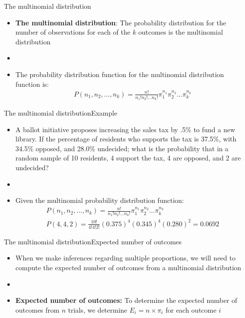 \documentclass[xcolor=dvipsnames]{beamer}
\begin{document}
\begin{frame}{The multinomial distribution}
	\begin{itemize}
		\item \textbf{The multinomial distribution}: The probability distribution for the number of observations for each of the $k$ outcomes is the multinomial distribution
		\item[]
		\item The probability distribution function for the multinomial distribution function is:
		\begin{gather*}
			P(n_1, n_2, \hdots, n_k) = \frac{n!}{n_1!n_2!\hdots n_k!}\pi_1^{n_1}\pi_2^{n_2}\hdots \pi_k^{n_k}
		\end{gather*}
	\end{itemize}
\end{frame}

\begin{frame}{The multinomial distribution}{Example}
	\begin{itemize}
		\item A ballot initiative proposes increasing the sales tax by .5\% to fund a new library. If the percentage of residents who supports the tax is 37.5\%, with 34.5\% opposed, and 28.0\% undecided; what is the probability that in a random sample of 10 residents, 4 support the tax, 4 are opposed, and 2 are undecided?
		\item[]
		\item Given the multinomial probability distribution function:
		\begin{gather*}
			P(n_1, n_2, \hdots, n_k) = \frac{n!}{n_1!n_2!\hdots n_k!}\pi_1^{n_1}\pi_2^{n_2}\hdots \pi_k^{n_k} \\
			P(4, 4, 2) = \frac{10!}{4!4!2!}(0.375)^{4}(0.345)^{4}(0.280)^{2} = 0.0692
		\end{gather*}
	\end{itemize}
\end{frame}

\begin{frame}{The multinomial distribution}{Expected number of outcomes}
	\begin{itemize}
		\item When we make inferences regarding multiple proportions, we will need to compute the expected number of outcomes from a multinomial distribution
		\item[]
		\item \textbf{Expected number of outcomes:} To determine the expected number of outcomes from $n$ trials, we determine $E_i = n\times \pi_i$ for each outcome $i$
	\end{itemize}
\end{frame}
\end{document}
